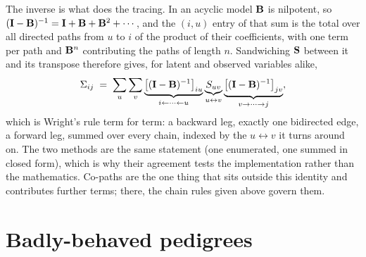 \documentclass[12pt]{article}
\numberwithin{equation}{section}
\begin{document}
The inverse is what does the tracing.
In an acyclic model $\mathbf{B}$ is nilpotent, so $(\mathbf{I}-\mathbf{B})^{-1} = \mathbf{I} + \mathbf{B} + \mathbf{B}^2 + \cdots$, and the $(i,u)$ entry of that sum is the total over all directed paths from $u$ to $i$ of the product of their coefficients, with one term per path and $\mathbf{B}^n$ contributing the paths of length $n$.
Sandwiching $\mathbf{S}$ between it and its transpose therefore gives, for latent and observed variables alike,
\begin{equation}\label{eq:ram-trace}
    \Sigma_{ij} \;=\; \sum_{u}\sum_{v}
    \underbrace{\big[(\mathbf{I}-\mathbf{B})^{-1}\big]_{iu}}_{i \leftarrow \cdots \leftarrow u}
    \underbrace{S_{uv}}_{u \leftrightarrow v}
    \underbrace{\big[(\mathbf{I}-\mathbf{B})^{-1}\big]_{jv}}_{v \rightarrow \cdots \rightarrow j} ,
\end{equation}
which is Wright's rule term for term: a backward leg, exactly one bidirected edge, a forward leg, summed over every chain, indexed by the $u \leftrightarrow v$ it turns around on.
The two methods are the same statement (one enumerated, one summed in closed form), which is why their agreement tests the implementation rather than the mathematics.
Co-paths are the one thing that sits outside this identity and contributes further terms; there, the chain rules given above govern them.

\section{Badly-behaved pedigrees}\label{app:badly-behaved}
\end{document}
